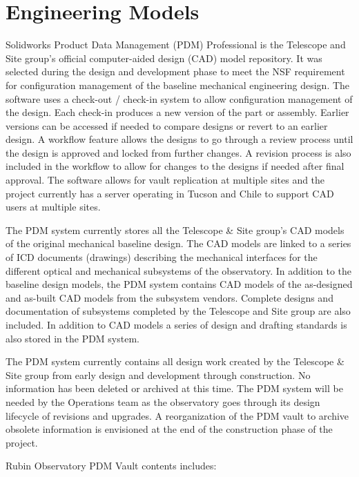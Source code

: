 \section{Engineering Models}

Solidworks Product Data Management (PDM) Professional \citep{PDM-cite} is the Telescope and Site group's official computer-aided design (CAD) model repository.
It was selected during the design and development phase to meet the NSF requirement for configuration management of the baseline mechanical engineering design.
The software uses a check-out / check-in system to allow configuration management of the design.
Each check-in produces a new version of the part or assembly.
Earlier versions can be accessed if needed to compare designs or revert to an earlier design.
A workflow feature allows the designs to go through a review process until the design is approved and locked from further changes.
A revision process is also included in the workflow to allow for changes to the designs if needed after final approval.
The software allows for vault replication at multiple sites and the project currently has a server operating in Tucson and Chile to support CAD users at multiple sites.

The PDM system currently stores all the Telescope \& Site group's CAD models of the original mechanical baseline design.
The CAD models are linked to a series of ICD documents (drawings) describing the mechanical interfaces for the different optical and mechanical subsystems of the observatory.
In addition to the baseline design models, the PDM system contains CAD models of the as-designed and as-built CAD models from the subsystem vendors.
Complete designs and documentation of subsystems completed by the Telescope and Site group are also included.
In addition to CAD models a series of design and drafting standards is also stored in the PDM system.

The PDM system currently contains all design work created by the Telescope \& Site group from early design and development through construction.
No information has been deleted or archived at this time.
The PDM system will be needed by the Operations team as the observatory goes through its design lifecycle of revisions and upgrades.
A reorganization of the PDM vault to archive obsolete information is envisioned at the end of the construction phase of the project.

Rubin Observatory PDM Vault contents includes:

